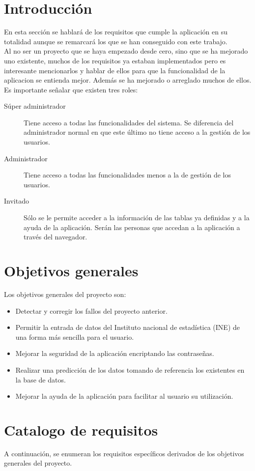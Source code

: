 
\section{Introducción}
En esta sección se hablará de los requisitos que cumple la aplicación en su totalidad aunque se remarcará los que se han conseguido con este trabajo.\\
Al no ser un proyecto que se haya empezado desde cero, sino que se ha mejorado uno existente, muchos de los requisitos ya estaban implementados pero es interesante mencionarlos y hablar de ellos para que la funcionalidad de la aplicacion se entienda mejor. Además se ha mejorado o arreglado muchos de ellos.\\
Es importante señalar que existen tres roles:
\begin{description}
    \item [Súper administrador] Tiene acceso a todas las funcionalidades del sistema. Se diferencia del administrador normal en que este último no tiene acceso a la gestión de los usuarios.
    \item [Administrador] Tiene acceso a todas las funcionalidades menos a la de gestión de los usuarios.
    \item [Invitado] Sólo se le permite acceder a la información de las tablas ya definidas y a la ayuda de la aplicación. Serán las personas que accedan a la aplicación a través del navegador.
\end{description}
\section{Objetivos generales}
Los objetivos generales del proyecto son:
\begin{itemize}
    \item Detectar y corregir los fallos del proyecto anterior.
    \item Permitir la entrada de datos del Instituto nacional de estadística (INE) de una forma más sencilla para el usuario.
    \item Mejorar la seguridad de la aplicación encriptando las contraseñas.
    \item Realizar una predicción de los datos tomando de referencia los existentes en la base de datos.
    \item Mejorar la ayuda de la aplicación para facilitar al usuario su utilización.
\end{itemize}
\section{Catalogo de requisitos}
A continuación, se enumeran los requisitos específicos derivados de los objetivos generales del proyecto.
